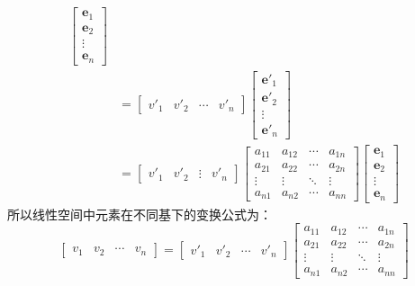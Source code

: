 \begin{definition}[坐标变换矩阵]
\begin{align*}
\begin{bmatrix}
            \mathbf{e}_1 \\ \mathbf{e}_2 \\ \vdots \\ \mathbf{e}_n
        \end{bmatrix} \\
        &= \begin{bmatrix}
            v'_1 & v'_2 & \cdots & v'_n
        \end{bmatrix}\begin{bmatrix}
            \mathbf{e}'_1 \\ \mathbf{e}'_2 \\ \vdots \\ \mathbf{e}'_n
        \end{bmatrix}\\
        &= \begin{bmatrix}
            v'_1 & v'_2 & \vdots & v'_n
        \end{bmatrix}\begin{bmatrix}
            a_{11} & a_{12} & \cdots & a_{1n} \\
            a_{21} & a_{22} & \cdots & a_{2n} \\
            \vdots & \vdots & \ddots & \vdots \\
            a_{n1} & a_{n2} & \cdots & a_{nn}
        \end{bmatrix}
        \begin{bmatrix}
            \mathbf{e}_1 \\ \mathbf{e}_2 \\ \vdots \\ \mathbf{e}_n
        \end{bmatrix}
    \end{align*}
    所以线性空间中元素在不同基下的变换公式为：
    \[
        \begin{bmatrix}
            v_1 & v_2 & \cdots & v_n
        \end{bmatrix} =
        \begin{bmatrix}
            v'_1 & v'_2 & \cdots & v'_n
        \end{bmatrix}
        \begin{bmatrix}
            a_{11} & a_{12} & \cdots & a_{1n} \\
            a_{21} & a_{22} & \cdots & a_{2n} \\
            \vdots & \vdots & \ddots & \vdots \\
            a_{n1} & a_{n2} & \cdots & a_{nn}
        \end{bmatrix}
\]
\end{definition}

